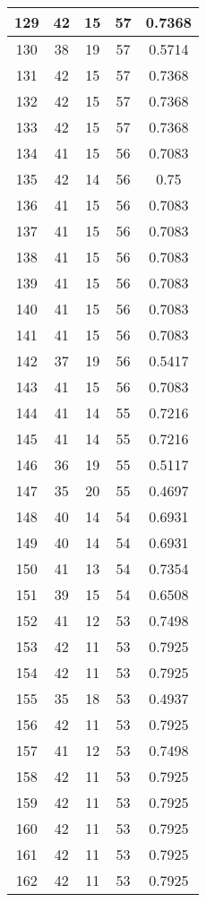 \documentclass[letterpaper, 12pt]{article}
\begin{document}
\begin{longtable}{|c|c|c|c|c|}
\hline
129 & 42 & 15 & 57 & 0.7368 \\
\hline
130 & 38 & 19 & 57 & 0.5714 \\
\hline
131 & 42 & 15 & 57 & 0.7368 \\
\hline
132 & 42 & 15 & 57 & 0.7368 \\
\hline
133 & 42 & 15 & 57 & 0.7368 \\
\hline
134 & 41 & 15 & 56 & 0.7083 \\
\hline
135 & 42 & 14 & 56 & 0.75 \\
\hline
136 & 41 & 15 & 56 & 0.7083 \\
\hline
137 & 41 & 15 & 56 & 0.7083 \\
\hline
138 & 41 & 15 & 56 & 0.7083 \\
\hline
139 & 41 & 15 & 56 & 0.7083 \\
\hline
140 & 41 & 15 & 56 & 0.7083 \\
\hline
141 & 41 & 15 & 56 & 0.7083 \\
\hline
142 & 37 & 19 & 56 & 0.5417 \\
\hline
143 & 41 & 15 & 56 & 0.7083 \\
\hline
144 & 41 & 14 & 55 & 0.7216 \\
\hline
145 & 41 & 14 & 55 & 0.7216 \\
\hline
146 & 36 & 19 & 55 & 0.5117 \\
\hline
147 & 35 & 20 & 55 & 0.4697 \\
\hline
148 & 40 & 14 & 54 & 0.6931 \\
\hline
149 & 40 & 14 & 54 & 0.6931 \\
\hline
150 & 41 & 13 & 54 & 0.7354 \\
\hline
151 & 39 & 15 & 54 & 0.6508 \\
\hline
152 & 41 & 12 & 53 & 0.7498 \\
\hline
153 & 42 & 11 & 53 & 0.7925 \\
\hline
154 & 42 & 11 & 53 & 0.7925 \\
\hline
155 & 35 & 18 & 53 & 0.4937 \\
\hline
156 & 42 & 11 & 53 & 0.7925 \\
\hline
157 & 41 & 12 & 53 & 0.7498 \\
\hline
158 & 42 & 11 & 53 & 0.7925 \\
\hline
159 & 42 & 11 & 53 & 0.7925 \\
\hline
160 & 42 & 11 & 53 & 0.7925 \\
\hline
161 & 42 & 11 & 53 & 0.7925 \\
\hline
162 & 42 & 11 & 53 & 0.7925 \\

\end{longtable}
\end{document}
